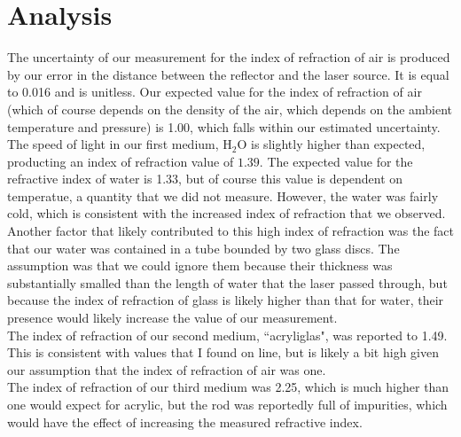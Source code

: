 \documentclass{amsart}
\begin{document}
\section{Analysis}
The uncertainty of our measurement for the index of refraction of air is produced by our error in the distance between the reflector and the laser source. It is equal to 0.016 and is unitless. Our expected value for the index of refraction of air (which of course depends on the density of the air, which depends on the ambient temperature and pressure) is 1.00, which falls within our estimated uncertainty. \\
The speed of light in our first medium, $\text{H}_2\text{O}$ is slightly higher than expected, producting an index of refraction value of $1.39$. The expected value for the refractive index of water is 1.33, but of course this value is dependent on temperatue, a quantity that we did not measure. However, the water was fairly cold, which is consistent with the increased index of refraction that we observed. Another factor that likely contributed to this high index of refraction was the fact that our water was contained in a tube bounded by two glass discs. The assumption was that we could ignore them because their thickness was substantially smalled than the length of water that the laser passed through, but because the index of refraction of glass is likely higher than that for water, their presence would likely increase the value of our measurement.\\
The index of refraction of our second medium, ``acryliglas", was reported to 1.49. This is consistent with values that I found on line, but is likely a bit high given our assumption that the index of refraction of air was one.\\
The index of refraction of our third medium was 2.25, which is much higher than one would expect for acrylic, but the rod was reportedly full of impurities, which would have the effect of increasing the measured refractive index.
\end{document}
